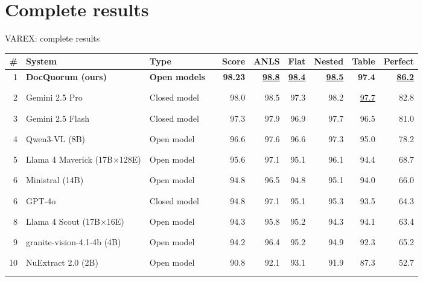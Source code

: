 \documentclass[aspectratio=169,10pt]{beamer}
\begin{document}
\section{Complete results}
\begin{frame}{VAREX: complete results}
\begingroup\scriptsize\renewcommand{\arraystretch}{0.74}\setlength{\tabcolsep}{4pt}
\begin{tabularx}{\textwidth}{@{}rYl@{\hspace{6pt}}lrrrrrr@{}}\toprule
\textbf{\#} & \textbf{System} & \textbf{Type} &  & \textbf{Score} & \textbf{ANLS} & \textbf{Flat} & \textbf{Nested} & \textbf{Table} & \textbf{Perfect}\\\midrule
{}1 & \textbf{DocQuorum (ours)} & {\color{good}\textbf{Open models}} & \textcolor{good}{\rule{1.18cm}{1.05ex}} & \textbf{98.23} & \textbf{\underline{98.8}} & \textbf{\underline{98.4}} & \textbf{\underline{98.5}} & \textbf{97.4} & \textbf{\underline{86.2}}\\
2 & Gemini 2.5 Pro & {\color{muted}Closed model} & \textcolor{muted!45}{\rule{1.18cm}{1.05ex}} & 98.0 & 98.5 & 97.3 & 98.2 & \underline{97.7} & 82.8\\
3 & Gemini 2.5 Flash & {\color{muted}Closed model} & \textcolor{muted!45}{\rule{1.17cm}{1.05ex}} & 97.3 & 97.9 & 96.9 & 97.7 & 96.5 & 81.0\\
4 & Qwen3-VL (8B) & {\color{good}Open model} & \textcolor{good!45}{\rule{1.16cm}{1.05ex}} & 96.6 & 97.6 & 96.6 & 97.3 & 95.0 & 78.2\\
5 & Llama 4 Maverick (17B×128E) & {\color{good}Open model} & \textcolor{good!45}{\rule{1.15cm}{1.05ex}} & 95.6 & 97.1 & 95.1 & 96.1 & 94.4 & 68.7\\
6 & Ministral (14B) & {\color{good}Open model} & \textcolor{good!45}{\rule{1.14cm}{1.05ex}} & 94.8 & 96.5 & 94.8 & 95.1 & 94.0 & 66.0\\
6 & GPT-4o & {\color{muted}Closed model} & \textcolor{muted!45}{\rule{1.14cm}{1.05ex}} & 94.8 & 97.1 & 95.1 & 95.3 & 93.5 & 64.3\\
8 & Llama 4 Scout (17B×16E) & {\color{good}Open model} & \textcolor{good!45}{\rule{1.13cm}{1.05ex}} & 94.3 & 95.8 & 95.2 & 94.3 & 94.1 & 63.4\\
9 & granite-vision-4.1-4b (4B) & {\color{good}Open model} & \textcolor{good!45}{\rule{1.13cm}{1.05ex}} & 94.2 & 96.4 & 95.2 & 94.9 & 92.3 & 65.2\\
10 & NuExtract 2.0 (2B) & {\color{good}Open model} & \textcolor{good!45}{\rule{1.09cm}{1.05ex}} & 90.8 & 92.1 & 93.1 & 91.9 & 87.3 & 52.7\\

\end{tabularx}
\end{frame}
\end{document}
